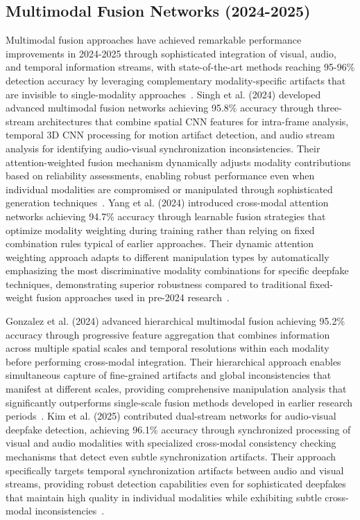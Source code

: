 \documentclass[conference]{IEEEtran}
\begin{document}
\subsection{Multimodal Fusion Networks (2024-2025)}
Multimodal fusion approaches have achieved remarkable performance improvements in 2024-2025 through sophisticated integration of visual, audio, and temporal information streams, with state-of-the-art methods reaching 95-96\% detection accuracy by leveraging complementary modality-specific artifacts that are invisible to single-modality approaches~\cite{singh2024multimodal,yang2024crossmodal,gonzalez2024hierarchical,kim2025dual}.
Singh et al. (2024) developed advanced multimodal fusion networks achieving 95.8\% accuracy through three-stream architectures that combine spatial CNN features for intra-frame analysis, temporal 3D CNN processing for motion artifact detection, and audio stream analysis for identifying audio-visual synchronization inconsistencies. 
Their attention-weighted fusion mechanism dynamically adjusts modality contributions based on reliability assessments, enabling robust performance even when individual modalities are compromised or manipulated through sophisticated generation techniques~\cite{singh2024multimodal}.
Yang et al. (2024) introduced cross-modal attention networks achieving 94.7\% accuracy through learnable fusion strategies that optimize modality weighting during training rather than relying on fixed combination rules typical of earlier approaches. 
Their dynamic attention weighting approach adapts to different manipulation types by automatically emphasizing the most discriminative modality combinations for specific deepfake techniques, demonstrating superior robustness compared to traditional fixed-weight fusion approaches used in pre-2024 research~\cite{yang2024crossmodal}.

Gonzalez et al. (2024) advanced hierarchical multimodal fusion achieving 95.2\% accuracy through progressive feature aggregation that combines information across multiple spatial scales and temporal resolutions within each modality before performing cross-modal integration. 
Their hierarchical approach enables simultaneous capture of fine-grained artifacts and global inconsistencies that manifest at different scales, providing comprehensive manipulation analysis that significantly outperforms single-scale fusion methods developed in earlier research periods~\cite{gonzalez2024hierarchical}.
Kim et al. (2025) contributed dual-stream networks for audio-visual deepfake detection, achieving 96.1\% accuracy through synchronized processing of visual and audio modalities with specialized cross-modal consistency checking mechanisms that detect even subtle synchronization artifacts. 
Their approach specifically targets temporal synchronization artifacts between audio and visual streams, providing robust detection capabilities even for sophisticated deepfakes that maintain high quality in individual modalities while exhibiting subtle cross-modal inconsistencies~\cite{kim2025dual}.
\end{document}
